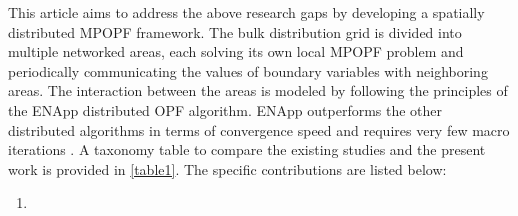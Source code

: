 \documentclass{article}
\begin{document}
This article aims to address the above research gaps by developing a spatially distributed MPOPF framework. The bulk distribution grid is divided into multiple networked areas, each solving its own local MPOPF problem and periodically communicating the values of boundary variables with neighboring areas. The interaction between the areas is modeled by following the principles of the ENApp distributed OPF algorithm. ENApp outperforms the other distributed algorithms in terms of convergence speed and requires very few macro iterations \cite{Sadnan}. A taxonomy table to compare the existing studies and the present work is provided in \ref{table1}. The specific contributions are listed below:
\begin{enumerate}
    \item  
\end{enumerate}
\end{document}
